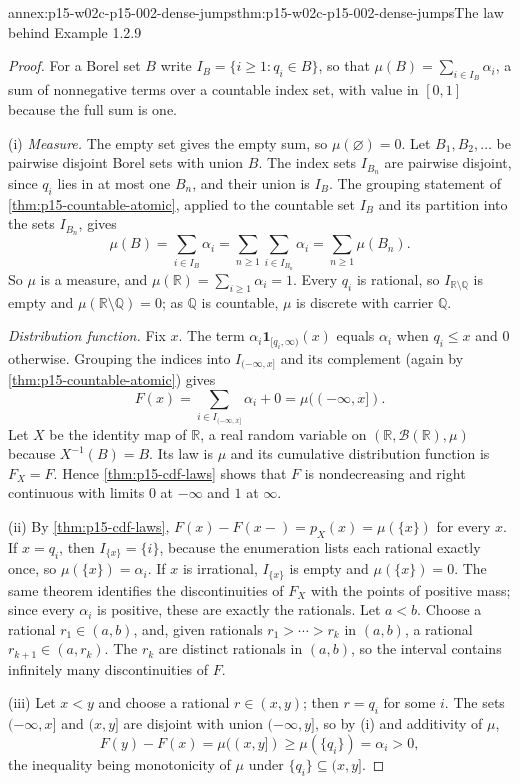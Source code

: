 \begin{annexitem}{annex:p15-w02c-p15-002-dense-jumps}{thm:p15-w02c-p15-002-dense-jumps}{The law behind Example 1.2.9}
\begin{proof}
For a Borel set \(B\) write \(I_B=\{i\geq1:q_i\in B\}\), so that
\(\mu(B)=\sum_{i\in I_B}\alpha_i\), a sum of nonnegative terms over a
countable index set, with value in \([0,1]\) because the full sum is one.

(i) \emph{Measure.} The empty set gives the empty sum, so
\(\mu(\varnothing)=0\). Let \(B_1,B_2,\ldots\) be pairwise disjoint Borel sets
with union \(B\). The index sets \(I_{B_n}\) are pairwise disjoint, since
\(q_i\) lies in at most one \(B_n\), and their union is \(I_B\). The grouping
statement of \cref{thm:p15-countable-atomic}, applied to the countable set
\(I_B\) and its partition into the sets \(I_{B_n}\), gives
\[
 \mu(B)=\sum_{i\in I_B}\alpha_i
       =\sum_{n\geq1}\sum_{i\in I_{B_n}}\alpha_i
       =\sum_{n\geq1}\mu(B_n).
\]
So \(\mu\) is a measure, and \(\mu(\mathbb R)=\sum_{i\geq1}\alpha_i=1\).
Every \(q_i\) is rational, so \(I_{\mathbb R\setminus\mathbb Q}\) is empty and
\(\mu(\mathbb R\setminus\mathbb Q)=0\); as \(\mathbb Q\) is countable, \(\mu\)
is discrete with carrier \(\mathbb Q\).

\emph{Distribution function.} Fix \(x\). The term
\(\alpha_i\mathbf1_{[q_i,\infty)}(x)\) equals \(\alpha_i\) when
\(q_i\leq x\) and \(0\) otherwise. Grouping the indices into
\(I_{(-\infty,x]}\) and its complement (again by
\cref{thm:p15-countable-atomic}) gives
\[
 F(x)=\sum_{i\in I_{(-\infty,x]}}\alpha_i+0=\mu((-\infty,x]).
\]
Let \(X\) be the identity map of \(\mathbb R\), a real random variable on
\((\mathbb R,\mathcal B(\mathbb R),\mu)\) because \(X^{-1}(B)=B\). Its law is
\(\mu\) and its cumulative distribution function is \(F_X=F\). Hence
\cref{thm:p15-cdf-laws} shows that \(F\) is nondecreasing and right
continuous with limits \(0\) at \(-\infty\) and \(1\) at \(\infty\).

(ii) By \cref{thm:p15-cdf-laws}, \(F(x)-F(x-)=p_X(x)=\mu(\{x\})\) for every
\(x\). If \(x=q_i\), then \(I_{\{x\}}=\{i\}\), because the enumeration lists
each rational exactly once, so \(\mu(\{x\})=\alpha_i\). If \(x\) is
irrational, \(I_{\{x\}}\) is empty and \(\mu(\{x\})=0\). The same theorem
identifies the discontinuities of \(F_X\) with the points of positive mass;
since every \(\alpha_i\) is positive, these are exactly the rationals. Let
\(a<b\). Choose a rational \(r_1\in(a,b)\), and, given rationals
\(r_1>\cdots>r_k\) in \((a,b)\), a rational \(r_{k+1}\in(a,r_k)\). The
\(r_k\) are distinct rationals in \((a,b)\), so the interval contains
infinitely many discontinuities of \(F\).

(iii) Let \(x<y\) and choose a rational \(r\in(x,y)\); then \(r=q_i\) for some
\(i\). The sets \((-\infty,x]\) and \((x,y]\) are disjoint with union
\((-\infty,y]\), so by (i) and additivity of \(\mu\),
\[
 F(y)-F(x)=\mu((x,y])\geq\mu(\{q_i\})=\alpha_i>0,
\]
the inequality being monotonicity of \(\mu\) under
\(\{q_i\}\subseteq(x,y]\).
\end{proof}
\end{annexitem}

